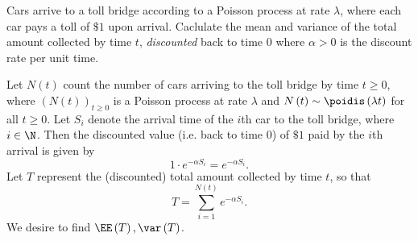 \documentclass[stat333]{subfiles}
\begin{document}
    \ex Cars arrive to a toll bridge according to a Poisson process at rate $\lambda$, where each car pays a toll of $\$1$ upon arrival. Caclulate the mean and variance of the total amount collected by time $t$, \textit{discounted} back to time $0$ where $\alpha>0$ is the discount rate per unit time.

    \begin{subproof}[Answer]
        Let $N\left( t \right)$ count the number of cars arriving to the toll bridge by time $t\geq 0$, where $\left( N\left( t \right) \right)^{}_{t\geq 0}$ is a Poisson process at rate $\lambda$ and $N\left( t \right)\sim\poidis\left( \lambda t \right)$ for all $t\geq 0$. Let $S_i$ denote the arrival time of the $i$th car to the toll bridge, where $i\in\N$. Then the discounted value (i.e. back to time $0$) of $\$1$ paid by the $i$th arrival is given by
        \begin{equation*}
            1\cdot e^{-\alpha S_i} = e^{-\alpha S_i}. 
        \end{equation*}
        Let $T$ represent the (discounted) total amount collected by time $t$, so that
        \begin{equation*}
            T = \sum^{N\left( t \right)}_{i=1} e^{-\alpha S_i}.
        \end{equation*}
        We desire to find $\EE\left( T \right), \var\left( T \right)$.


\end{subproof}
\end{document}
